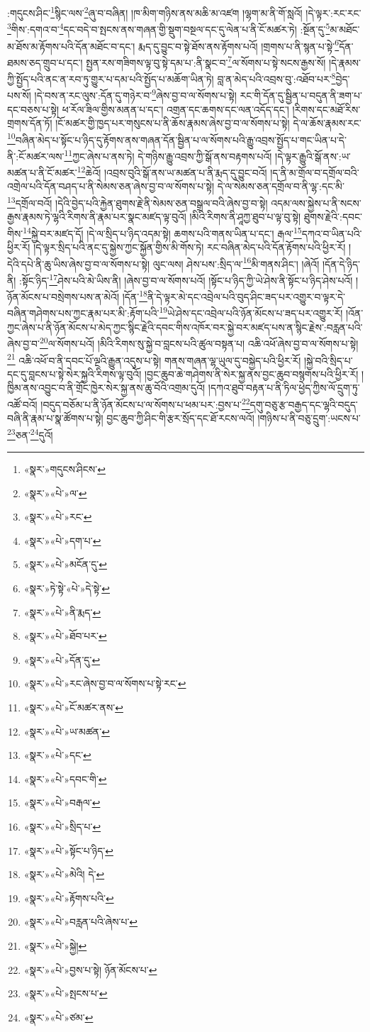 :གདུངས་ཤིང་\footnote{«སྣར་»གདུངས་ཤིངས་}སྙིང་ལས་\footnote{«སྣར་»«པེ་»ལ་}ཞུ་བ་བཞིན། །ཁ་མིག་གཉིས་ནས་མཆི་མ་འཛག །ལྷག་མ་ནི་གོ་སླའོ། །དེ་ལྟར་:རང་རང་\footnote{«སྣར་»«པེ་»རང་}གིས་:དགའ་བ་\footnote{«སྣར་»«པེ་»དག་པ་}དང་བདེ་བ་སྤངས་ནས་གཞན་གྱི་སྡུག་བསྔལ་དང་དུ་ལེན་པ་ནི་ངོ་མཚར་ཏེ། :སྔོན་དུ་\footnote{«སྣར་»«པེ་»མངོན་དུ་}མ་མཐོང་མ་ཐོས་མ་རྟོགས་པའི་དོན་མཐོང་བ་དང་། རྨད་དུ་བྱུང་བ་སྟེ་ཐོས་ནས་རྟོགས་པའོ། །གྲགས་པ་ནི་སྙན་པ་སྟེ་\footnote{«སྣར་»ཏེ་སྟེ་«པེ་»དེ་སྟེ་}དོན་ཐམས་ཅད་གྲུབ་པ་དང་། སྤྱན་རས་གཟིགས་ལྟ་བུ་སྟེ་དམ་པ་:ནི་སྣང་བ་\footnote{«སྣར་»«པེ་»ནི་རྨད་}ལ་སོགས་པ་སྟེ་སངས་རྒྱས་སོ། །དེ་རྣམས་ཀྱི་སྤྱོད་པའི་ནང་ན་རབ་ཏུ་གྱུར་པ་དམ་པའི་སྤྱོད་པ་མཆོག་ཡིན་ཏེ། བླ་ན་མེད་པའི་འབྲས་བུ་:འཐོབ་པར་\footnote{«སྣར་»«པེ་»ཐོབ་པར་}བྱེད་པས་སོ། །དེ་བས་ན་རང་ལུས་:དོན་དུ་གཉེར་བ་\footnote{«སྣར་»«པེ་»དོན་དུ་}ཞེས་བྱ་བ་ལ་སོགས་པ་སྟེ། རང་གི་དོན་དུ་སྦྱིན་པ་བདུན་ནི་ཟག་པ་དང་བཅས་པ་སྟེ། ཕ་རོལ་ཟིལ་གྱིས་མནན་པ་དང་། འགྲན་དང་ཆགས་དང་ལན་འདོད་དང་། །རིགས་དང་མཐོ་རིས་གྲགས་དོན་ཏོ། །ངོ་མཚར་གྱི་ཁྱད་པར་གསུངས་པ་ནི་ཆོས་རྣམས་ཞེས་བྱ་བ་ལ་སོགས་པ་སྟེ། དེ་ལ་ཆོས་རྣམས་རང་\footnote{«སྣར་»«པེ་»རང་ཞེས་བྱ་བ་ལ་སོགས་པ་སྟེ་རང་}བཞིན་མེད་པ་སྟོང་པ་ཉིད་དུ་རྟོགས་ནས་གཞན་དོན་སྦྱིན་པ་ལ་སོགས་པའི་རྒྱུ་འབྲས་སྤྱོད་པ་གང་ཡིན་པ་དེ་ནི་:ངོ་མཚར་ལས་\footnote{«སྣར་»«པེ་»ངོ་མཚར་ནས་}ཀྱང་ཞེས་པ་ནས་ཏེ། དེ་གཉིས་རྒྱུ་འབྲས་ཀྱི་སྒོ་ནས་བརྟགས་པའོ། །དེ་ལྟར་རྒྱུའི་སྒོ་ནས་:ཡ་མཚན་པ་ནི་ངོ་མཚར་\footnote{«སྣར་»«པེ་»ཡ་མཚན་}ཆེའོ། །འབྲས་བུའི་སྒོ་ནས་ཡ་མཚན་པ་ནི་རྨད་དུ་བྱུང་བའོ། །ད་ནི་མ་གྲོལ་བ་དགྲོལ་བའི་འགྲེལ་པའི་དོན་བཤད་པ་ནི་སེམས་ཅན་ཞེས་བྱ་བ་ལ་སོགས་པ་སྟེ། དེ་ལ་སེམས་ཅན་དགྲོལ་བ་ནི་ལྷ་:དང་མི་\footnote{«སྣར་»«པེ་»དང་}དགྲོལ་བའོ། །དེའི་བྱེད་པའི་རྐྱེན་ཐུགས་རྗེ་ནི་སེམས་ཅན་བསྒྲལ་བའི་ཞེས་བྱ་བ་སྟེ། འདམ་ལས་སྐྱེས་པ་ནི་སངས་རྒྱས་རྣམས་ཏེ་ལྷའི་རིགས་ནི་རྣམ་པར་སྣང་མཛད་ལྟ་བུའོ། །མིའི་རིགས་ནི་ཤཱཀྱ་ཐུབ་པ་ལྟ་བུ་སྟེ། ཐུགས་རྗེའི་:དབང་གིས་\footnote{«སྣར་»«པེ་»དབང་གི་}སྐྱེ་བར་མཛད་དོ། །དེ་ལ་སྲིད་པ་ཉིད་འདམ་སྟེ། ཆགས་པའི་གནས་ཡིན་པ་དང་། རྒལ་\footnote{«སྣར་»«པེ་»བརྒལ་}དཀའ་བ་ཡིན་པའི་ཕྱིར་རོ། །དེ་ལྟར་སྲིད་པའི་ནང་དུ་སྐྱེས་ཀྱང་སྐྱོན་གྱིས་མི་གོས་ཏེ། རང་བཞིན་མེད་པའི་དོན་རྟོགས་པའི་ཕྱིར་རོ། །དེའི་དཔེ་ནི་ཆུ་ཡིས་ཞེས་བྱ་བ་ལ་སོགས་པ་སྟེ། ལུང་ལས། ཤེས་པས་:སྲིད་ལ་\footnote{«སྣར་»«པེ་»སྲིད་པ་}མི་གནས་ཤིང་། །ཞེའོ། །དོན་དེ་ཉིད་ནི། :སྟོང་ཉིད་\footnote{«སྣར་»«པེ་»སྟོང་པ་ཉིད་}ཤེས་པའི་མེ་ཡིས་ནི། །ཞེས་བྱ་བ་ལ་སོགས་པའོ། །སྟོང་པ་ཉིད་ཀྱི་ཡེ་ཤེས་ནི་སྟོང་པ་ཉིད་ཤེས་པའོ། །ཉོན་མོངས་པ་བསྲེགས་པས་ན་མེའོ། །དོན་\footnote{«སྣར་»«པེ་»མེའི། དེ་}ནི་དེ་ལྟར་མེ་དང་འབྲེལ་པའི་བུད་ཤིང་ཟད་པར་འགྱུར་བ་ལྟར་དེ་བཞིན་གཤེགས་པས་ཀྱང་རྣམ་པར་མི་:རྟོག་པའི་\footnote{«སྣར་»«པེ་»རྟོགས་པའི་}ཡེ་ཤེས་དང་འབྲེལ་པའི་ཉོན་མོངས་པ་ཟད་པར་འགྱུར་རོ། །འོན་ཀྱང་ཞེས་པ་ནི་ཉོན་མོངས་པ་མེད་ཀྱང་སྙིང་རྗེའི་དབང་གིས་འཁོར་བར་སྐྱེ་བར་མཛད་པས་ན་སྙིང་རྗེས་:བརླན་པའི་ཞེས་བྱ་བ་\footnote{«སྣར་»«པེ་»བརླན་པའི་ཞེས་པ་}ལ་སོགས་པའོ། །མིའི་རིགས་སུ་སྐྱེ་བ་བླངས་པའི་ཚུལ་བསྟན་པ། འཆི་འཕོ་ཞེས་བྱ་བ་ལ་སོགས་པ་སྟེ།\footnote{«སྣར་»«པེ་»སྐྱེ།} འཆི་འཕོ་བ་ནི་དབང་པོ་ལྔའི་རྒྱུན་འདུས་པ་སྟེ། གནས་གཞན་ལྷ་ཡུལ་དུ་བསྐྱེད་པའི་ཕྱིར་རོ། །སྐྱེ་བའི་སྲིད་པ་དང་དུ་བླངས་པ་སྟེ་སེར་སྐྱའི་རིགས་ལྟ་བུའོ། །བྱང་ཆུབ་ཆེ་གཤེགས་ནི་སེར་སྐྱ་ནས་བྱང་ཆུབ་བསྙགས་པའི་ཕྱིར་རོ། །ཁྱིམ་ནས་འབྱུང་བ་ནི་གྲོང་ཁྱེར་སེར་སྐྱ་ནས་ཆུ་བོའི་འགྲམ་དུའོ། །དཀའ་ཐུབ་བརྟན་པ་ནི་ཏིལ་ཕྱེད་ཀྱིས་ལོ་དྲུག་ཏུ་འཚོ་བའོ། །བདུད་བཅོམ་པ་ནི་ཉོན་མོངས་པ་ལ་སོགས་པ་ཕམ་པར་:བྱས་པ་\footnote{«སྣར་»«པེ་»བྱས་པ་སྟེ། ཉོན་མོངས་པ་}དགུ་བཅུ་རྩ་བརྒྱད་དང་ལྷའི་བདུད་བཞི་ནི་རྣམ་པ་སྣ་ཚོགས་པ་སྟེ། བྱང་ཆུབ་ཀྱི་ཤིང་གི་རྩར་སྲོད་དང་ཐོ་རངས་ལའོ། །གཉིས་པ་ནི་བཅུ་དྲུག་:ཡངས་པ་\footnote{«སྣར་»«པེ་»སྤངས་པ་}ཅན་\footnote{«སྣར་»«པེ་»ཙམ་}དུའོ། 